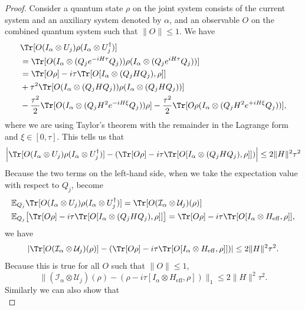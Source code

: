 \documentclass[twocolumn,superscriptaddress,aps,showpacs,amsmath,amstex,amssymb,citeautoscript,floatfix,pra,preprintnumbers]{revtex4-2}
\theoremstyle{plain}
\theoremstyle{plain}
\theoremstyle{plain}
\theoremstyle{plain}
\theoremstyle{plain}
\theoremstyle{plain}
\begin{document}
\begin{appendix}
\begin{proof}
    Consider a quantum state $\rho$ on the joint system consists of the current system and an auxiliary system denoted by $\alpha$, and an observable $O$ on the combined quantum system such that $\|O\|\leq 1$. We have 
    \[
    \begin{aligned}
        &\Tr[O (I_\alpha\otimes U_j)\rho (I_\alpha\otimes U_j^\dag)] \\
        &= \Tr[O (I_\alpha\otimes (Q_j e^{-iH\tau}Q_j))\rho (I_\alpha\otimes (Q_j e^{iH\tau}Q_j))] \\
        &= \Tr[O\rho] - i\tau \Tr[O[I_\alpha\otimes (Q_j H Q_j),\rho]] \\
        &+\tau^2\Tr[O(I_\alpha\otimes (Q_j H Q_j))\rho (I_\alpha\otimes (Q_j H Q_j))]\\
        &-\frac{\tau^2}{2}\Tr[O(I_\alpha\otimes (Q_j H^2 e^{-iH \xi}Q_j))\rho]-\frac{\tau^2}{2}\Tr[O\rho (I_\alpha\otimes (Q_j H^2 e^{+iH \xi}Q_j))],
    \end{aligned}
    \]
    where we are using Taylor's theorem with the remainder in the Lagrange form and $\xi\in [0,\tau]$. This tells us that
    \[
    \left|\Tr[O (I_\alpha\otimes U_j)\rho (I_\alpha\otimes U_j^\dag)] - (\Tr[O\rho] - i\tau \Tr[O[I_\alpha\otimes (Q_j H Q_j),\rho]] )\right|\leq 2\|H\|^2\tau^2
    \]
    Because the two terms on the left-hand side, when we take the expectation value with respect to $Q_j$, become
    \[
    \begin{aligned}
        &\mathbb{E}_{Q_j} \Tr[O (I_\alpha\otimes U_j)\rho (I_\alpha\otimes U_j^\dag)] = \Tr[O (\mathcal{I}_\alpha\otimes \mathcal{U}_j)(\rho)] \\
        &\mathbb{E}_{Q_j} \big[\Tr[O\rho] - i\tau \Tr[O[I_\alpha\otimes (Q_j H Q_j),\rho]] \big] = \Tr[O\rho] - i\tau \Tr[O[I_\alpha\otimes H_{\mathrm{eff}},\rho]],
    \end{aligned}
    \]
    we have
    \begin{equation*}
         \left|\Tr[O (\mathcal{I}_\alpha\otimes \mathcal{U}_j)(\rho)] - (\Tr[O\rho] - i\tau \Tr[O[I_\alpha\otimes H_{\mathrm{eff}},\rho]])\right|\leq 2\|H\|^2\tau^2.
    \end{equation*}
    Because this is true for all $O$ such that $\|O\|\leq 1$,
    \begin{equation}
    \label{eq:random_unitary_short_time_approx}
        \|(\mathcal{I}_\alpha\otimes \mathcal{U}_j)(\rho)-(\rho-i\tau [I_\alpha\otimes H_{\mathrm{eff}},\rho])\|_1\leq 2\|H\|^2\tau^2.
    \end{equation}
    Similarly we can also show that
    \begin{equation}

\end{equation}
\end{proof}
\end{appendix}
\end{document}
